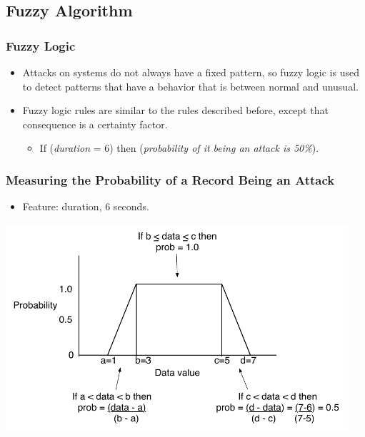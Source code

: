 \documentclass{beamer}
\newcommand{\linespace}{\vskip 0.25cm}
\begin{document}
\subsection{Fuzzy Algorithm}

\begin{frame}
	\frametitle{Fuzzy Logic}
	\begin{itemize}
		\item Attacks on systems do not always have a fixed pattern, so fuzzy logic is used to detect patterns that have a behavior that is between normal and unusual.
		\item Fuzzy logic rules are similar to the rules described before, except that
consequence is a certainty factor. 
		\begin{itemize}
			\item If (\emph{duration} = 6) then (\emph{probability of it being an attack is 50\%}).
		\end{itemize}
	\end{itemize}
\end{frame}


\begin{frame}
  \frametitle{Measuring the Probability of a Record Being an Attack}
	\begin{itemize}	
	\item Feature: duration, 6 seconds.
	\end{itemize}
  \includegraphics[width=0.95\textwidth]{../trapFigExample.pdf}


\end{frame}
\end{document}
